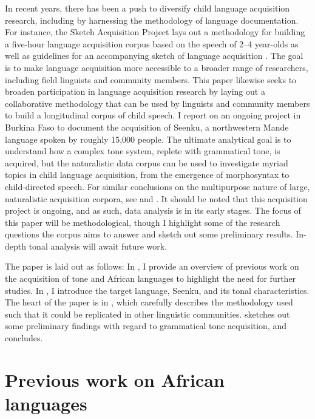 \documentclass[output=paper,colorlinks,citecolor=brown,
]{langscibook}
\begin{document}
In recent years, there has been a push to diversify child language acquisition research, including by harnessing the methodology of language documentation. For instance, the Sketch Acquisition Project lays out a methodology for building a five-hour language acquisition corpus based on the speech of 2--4 year-olds as well as guidelines for an accompanying sketch of language acquisition \citep{Hellwigetal21, Definaetal23a, Definaetal23b}. The goal is to make language acquisition more accessible to a broader range of researchers, including field linguists and community members. This paper likewise seeks to broaden participation in language acquisition research by laying out a collaborative methodology that can be used by linguists and community members to build a longitudinal corpus of child speech. I report on an ongoing project in Burkina Faso to document the acquisition of Seenku, a northwestern Mande language spoken by roughly 15,000 people. The ultimate analytical goal is to understand how a complex tone system, replete with grammatical tone, is acquired, but the naturalistic data corpus can be used to investigate myriad topics in child language acquisition, from the emergence of morphosyntax to child-directed speech. For similar conclusions on the multipurpose nature of large, naturalistic acquisition corpora, see \citet{Snyder21} and \citet{Demuth22}. It should be noted that this acquisition project is ongoing, and as such, data analysis is in its early stages. The focus of this paper will be methodological, though I highlight some of the research questions the corpus aims to answer and sketch out some preliminary results. In-depth tonal analysis will await future work. 

The paper is laid out as follows: In , I provide an overview of previous work on the acquisition of tone and African languages to highlight the need for further studies. In , I introduce the target language, Seenku, and its tonal characteristics. The heart of the paper is in , which carefully describes the methodology used such that it could be replicated in other linguistic communities.  sketches out some preliminary findings with regard to grammatical tone acquisition, and  concludes. 

\section{Previous work on African languages}\label{sec:mcpherson:previous}
\end{document}
